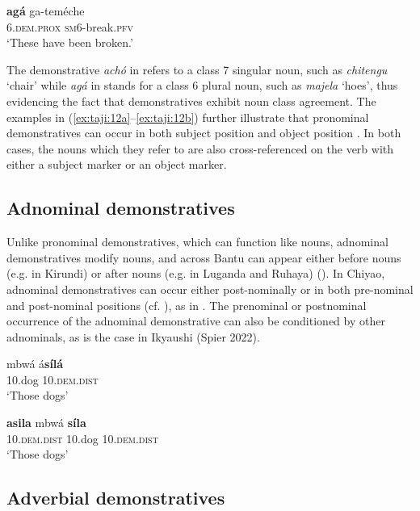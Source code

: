 \documentclass[output=paper,
            colorlinks, citecolor=brown
            ,draftmode
		  ]{langscibook}
\begin{document}
    \ex\label{ex:taji:12b}\gll  \textbf{agá}                        ga-teméche\\
      6.\textsc{dem.prox}     \textsc{sm6}-break.\textsc{pfv}\\  
      \glt ‘These have been broken.’
    \z
\z

The demonstrative \textit{achó} in  refers to a class 7 singular noun, such as \textit{chitengu} ‘chair’ while \textit{agá} in  stands for a class 6 plural noun, such as \textit{majela} ‘hoes’, thus evidencing the fact that demonstratives exhibit noun class agreement. The examples in (\ref{ex:taji:12a}--\ref{ex:taji:12b}) further illustrate that pronominal demonstratives can occur in both subject position  and object position . In both cases, the nouns which they refer to are also cross-referenced on the verb with either a subject marker or an object marker.

\subsection{Adnominal demonstratives}\label{sec:taji:4.2}

Unlike pronominal demonstratives, which can function like nouns, adnominal demonstratives modify nouns, and across Bantu can appear either before nouns (e.g. in Kirundi) or after nouns (e.g. in Luganda and Ruhaya) (\citealt{VandeVelde2005}). In Chiyao, adnominal demonstratives can occur either post-nominally  or in both pre-nominal and post-nominal positions (cf. ), as in . The prenominal or postnominal occurrence of the adnominal demonstrative can also be conditioned by other adnominals, as is the case in Ikyaushi (Spier 2022).


\ea%
    \label{ex:taji:13}
    \gll mbwá        á\textbf{sílá}\\
10.dog      10.\textsc{dem.dist}\\  
\glt ‘Those dogs’



\ex%
    \label{ex:taji:14}
    \gll \textbf{asila}                      mbwá      \textbf{síla}\\
  10.\textsc{dem.dist}   10.dog      10.\textsc{dem.dist}\\  
  \glt ‘Those dogs’
\z

\subsection{Adverbial demonstratives}\label{sec:taji:4.3}
\end{document}
